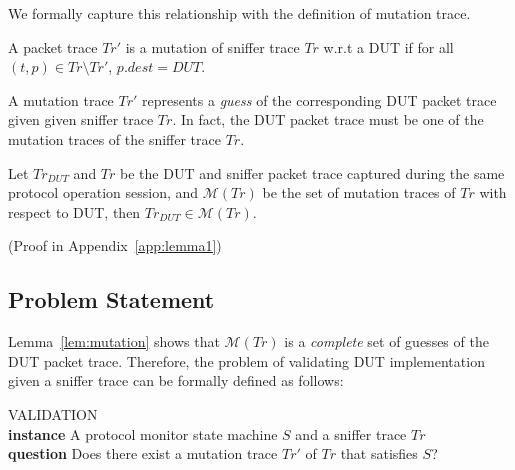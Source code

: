 We formally capture this relationship with the definition of mutation trace.

\begin{definition}
  \label{def:mutation}
  A packet trace $Tr'$ is a mutation of sniffer trace $Tr$ w.r.t a DUT if for
  all $(t, p) \in Tr\setminus Tr'$, $p.dest = DUT$.
\end{definition}

A mutation trace $Tr'$ represents a \textit{guess} of the corresponding DUT
packet trace given given sniffer trace $Tr$.  In fact, the DUT packet trace must
be one of the mutation traces of the sniffer trace $Tr$.

\begin{lemma}
  Let $Tr_{DUT}$ and $Tr$ be the DUT and sniffer packet trace captured during
  the same protocol operation session, and $\mathcal{M}(Tr)$ be the set of
  mutation traces of $Tr$ with respect to DUT, then $Tr_{DUT} \in \mathcal{M}(Tr)$.
  \label{lem:mutation}
\end{lemma}%
(Proof in Appendix~\ref{app:lemma1})


\subsection{Problem Statement}
\label{subsec:problem}

Lemma~\ref{lem:mutation} shows that $\mathcal{M}(Tr)$ is a \textit{complete} set
of guesses of the DUT packet trace. Therefore, the problem of validating DUT
implementation given a sniffer trace can be formally defined as follows:

\begin{problem}
  \label{prob:validation}
  VALIDATION\\
  \textbf{instance} A protocol monitor state machine $S$ and a sniffer trace $Tr$\\
  \textbf{question} Does there exist a mutation trace $Tr'$ of $Tr$ that satisfies $S$?
\end{problem}
